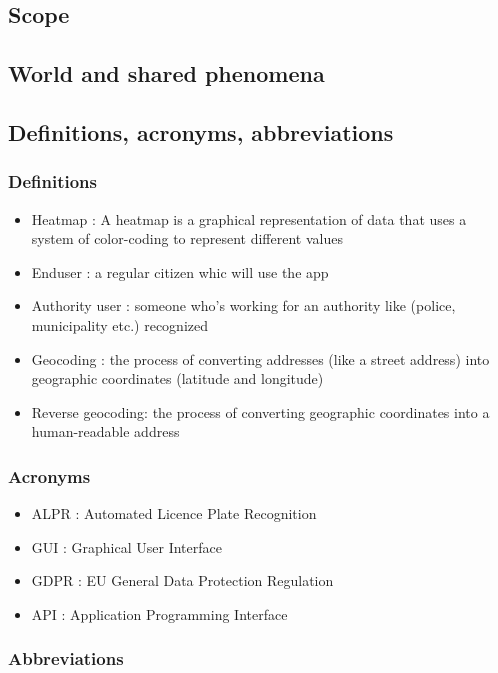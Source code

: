 \subsection{Scope}

\subsection{World and shared phenomena}




\subsection{Definitions,  acronyms,  abbreviations}

\subsubsection{Definitions}
\begin{itemize}
  \item{Heatmap} : A heatmap is a graphical representation of data that uses a system of color-coding to represent different values
  \item Enduser : a regular citizen whic will use the app
  \item Authority user : someone who's working for an authority like (police, municipality etc.) recognized
  \item Geocoding : the process of converting addresses (like a street address) into geographic coordinates (latitude and longitude)
  \item Reverse geocoding:  the process of converting geographic coordinates into a human-readable address

\end{itemize}

\subsubsection{Acronyms}
\begin{itemize}
  \item ALPR : Automated Licence Plate Recognition
  \item GUI : Graphical User Interface
  \item GDPR : EU General Data Protection Regulation
  \item API : Application Programming Interface
\end{itemize}

\subsubsection{Abbreviations}


